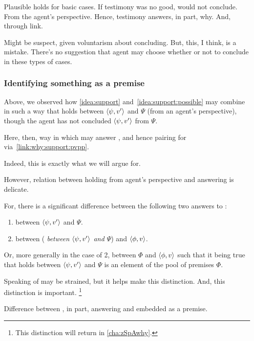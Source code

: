 \begin{note}
  Plausible holds for basic cases.
  If testimony was no good, would not conclude.
  From the agent's perspective.
  Hence, testimony answers, in part, why.
  And, through link.
\end{note}



\begin{note}
  Might be suspect, given voluntarism about concluding.
  But, this, I think, is a mistake.
  There's no suggestion that agent may choose whether or not to conclude in these types of cases.
\end{note}

\subsubsection{Identifying something as a premise}
\label{cha:clarification:sec:embedding}

\begin{note}
  Above, we observed how \autoref{idea:support} and~\autoref{idea:support:possible} may combine in such a way that \support{} holds between \(\langle \psi, v' \rangle\) and \(\Psi\) (from an agent's perspective), though the agent has not concluded \(\langle \psi, v' \rangle\) from \(\Psi\).

  Here, then, way in which \support{} may answer \qWhyV{}, and hence pairing for \qWhy{} via~\autoref{link:why:support:pvpp}.

  Indeed, this is exactly what we will argue for.

  However, relation between \support{} holding from agent's perspective and \support{} answering \qWhyV{} is delicate.

  For, there is a significant difference between the following two answers to \qWhyV{}:
  \begin{enumerate}
  \item
     between \(\langle \psi, v' \rangle\) and \(\Psi\).
  \item
     between (\emph{\support{} between \(\langle \psi, v' \rangle\) and \(\Psi\)}) and \(\langle \phi, v \rangle\).
  \end{enumerate}
  Or, more generally in the case of 2, \support{} between \(\Phi\) and \(\langle \phi, v \rangle\) such that it being true that \support{} holds between \(\langle \psi, v' \rangle\) and \(\Psi\) is an element of the pool of premises \(\Phi\).

  Speaking of \support{} may be strained, but it helps make this distinction.
  And, this distinction is important.%
  \footnote{
    This distinction will return in \autoref{cha:zSpAwhy}.
  }

  Difference between \support{}, in part, answering \qWhyV{} and \support{} embedded as a premise.
\end{note}

